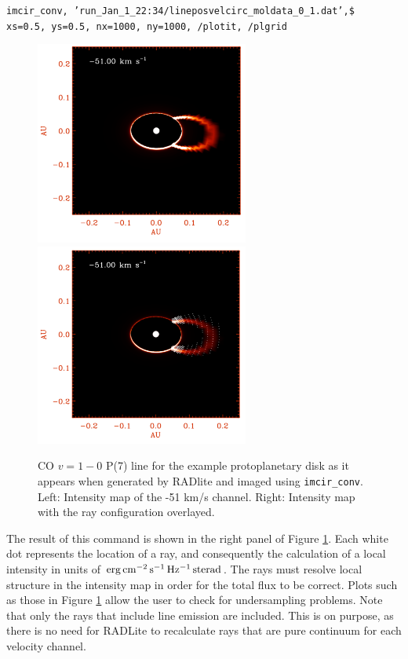 \documentclass[11pt]{article}
\begin{document}
{\tt imcir\_conv, 'run\_Jan\_1\_22:34/lineposvelcirc\_moldata\_0\_1.dat',\$\\
xs=0.5, ys=0.5, nx=1000, ny=1000, /plotit, /plgrid}\\
 
\begin{figure}
\centering
\includegraphics[width=7cm]{imcir_conv_ex1.pdf}
\includegraphics[width=7cm]{imcir_conv_ex2.pdf}
\caption{CO $v=1-0$ P(7) line for the example protoplanetary disk as it appears when generated by RADlite and imaged using {\tt imcir\_conv}.
Left: Intensity map of the -51 km/s channel. Right: Intensity map with the ray configuration overlayed.  }
\label{imcir_ex1}
\end{figure}

The result of this command is shown in the right panel of Figure \ref{imcir_ex1}. Each white dot represents the location of a ray, and consequently the calculation
of a local intensity in units of $\rm erg\,cm^{-2}\,s^{-1}\,Hz^{-1}\,sterad$. The rays must resolve local structure in the intensity map in order for the total flux
to be correct. Plots such as those in Figure \ref{imcir_ex1} allow the user to check for undersampling problems. Note that only the rays that include line emission are
included. This is on purpose, as there is no need for RADLite to recalculate rays that are pure continuum for each velocity channel.
\end{document}

